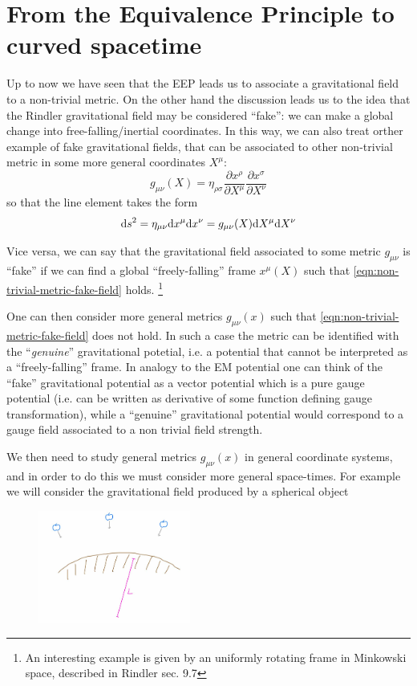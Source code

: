 \documentclass[../main/main.tex]{subfiles}
\begin{document}
\section{From the Equivalence Principle to curved spacetime}
Up to now we have seen that the EEP leads us to associate a gravitational field to a non-trivial metric. On the other hand the discussion leads us to the idea that the Rindler gravitational field may be considered ``fake'': we can make a global change into free-falling/inertial coordinates. In this way, we can also treat orther example of fake gravitational fields, that can be associated to other non-trivial metric in some more general coordinates $X^\mu$:
\begin{equation}\label{eqn:non-trivial-metric-fake-field}
g_{\mu\nu}(X)=\eta_{\rho\sigma}\frac{\partial x^\rho}{\partial X^\mu}\frac{\partial x^\sigma}{\partial X^\nu}
\end{equation}
so that  the line element takes the form
\[\textup{d} s^2=\eta_{\mu\nu}\textup{d} x^\mu \textup{d} x^\nu=g_{\mu\nu}(X)\textup{d} X^\mu\textup{d} X^\nu\]

Vice versa, we can say that the gravitational field associated to some metric $g_{\mu\nu}$ is ``fake'' if we can find a global ``freely-falling'' frame $x^\mu(X)$ such that \eqref {eqn:non-trivial-metric-fake-field} holds. 
\footnote{An interesting example is given by an uniformly rotating frame in Minkowski space, described in \textsf{Rindler sec. 9.7}}

One can then consider more general metrics $g_{\mu\nu}(x)$ such that  \eqref {eqn:non-trivial-metric-fake-field} does not hold. In such a case the metric can be identified with the ``\emph{genuine}'' gravitational potetial, i.e. a potential that cannot be interpreted as a ``freely-falling'' frame. 
In analogy to the EM potential one can think of the ``fake'' gravitational potential as a vector potential which is a pure gauge potential (i.e. can be written as derivative of some function defining gauge transformation), while a ``genuine'' gravitational potential would correspond to a gauge field associated to a non trivial field strength.

We then need to study general metrics $g_{\mu\nu}(x)$ in general coordinate systems, and in order to do this we must consider more general space-times. For example we will consider the gravitational field produced by a spherical object

\begin{figure}[H]
\centering
\includegraphics[width=5cm]{../img/grav-field-spheric-apples.jpg}
\end{figure}
\end{document}
